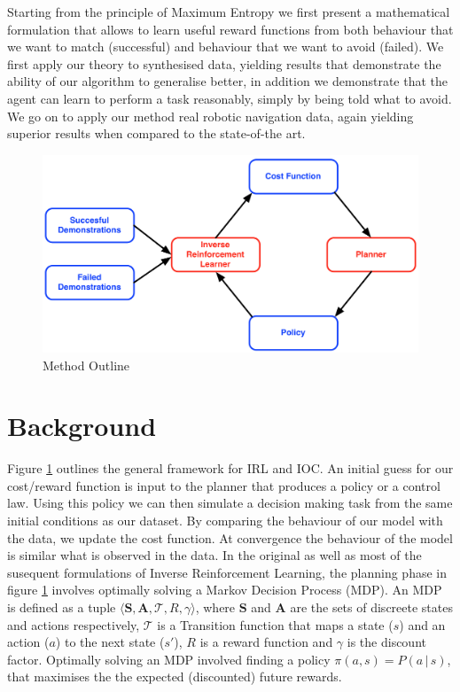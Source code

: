 \documentclass[letterpaper]{article}
\begin{document}
	 Starting from the principle of Maximum Entropy \cite{jaynes1957information} we first present a mathematical formulation that allows to learn useful reward functions from both behaviour that we want to match (successful) and behaviour that we want to avoid (failed). We first apply our theory to synthesised data, yielding results that demonstrate the ability of our algorithm to generalise better, in addition we demonstrate that the agent can learn to perform a task reasonably, simply by being told what to avoid. We go on to apply our method real robotic navigation data, again yielding superior results when compared to the state-of-the art.

	
\begin{figure}[t]
  \centering
  \includegraphics[width=0.9\columnwidth]{images/irlf.png}
  \caption{Method Outline 	\label{fig:IRLoutline}}
\end{figure}

\section{Background}
Figure \ref{fig:IRLoutline} outlines the general framework for IRL and IOC. An initial guess for our cost/reward function is input to the planner that produces a policy or a control law. Using this policy we can then simulate a decision making task from the same initial conditions as our dataset. By comparing the behaviour of our model with the data, we update the cost function. At convergence the behaviour of the model is similar what is observed in the data.
In the original as well as most of the susequent formulations of Inverse Reinforcement Learning, the planning phase in figure \ref{fig:IRLoutline} involves optimally solving a Markov Decision Process (MDP). An MDP is defined as a tuple $\langle\mathbf{S},\mathbf{A},\mathcal{T},R,\gamma\rangle$, where $\mathbf{S}$ and $\mathbf{A}$ are the sets of discreete states and actions respectively, $\mathcal{T}$ is a Transition function that maps a state ($s$) and an action ($a$) to the next state ($s'$), $R$ is a reward function and $\gamma$ is the discount factor. 
Optimally solving an MDP involved finding a policy $\pi(a,s) = P(a\,|\,s)$, that maximises the the expected (discounted) future rewards.
\end{document}
